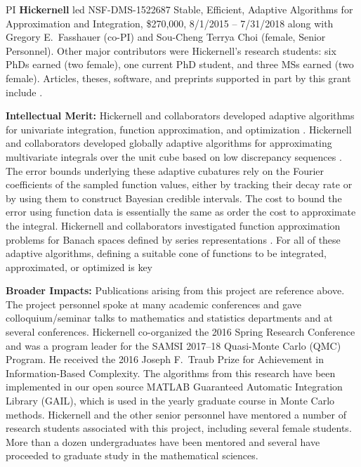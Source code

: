 \documentclass[11pt]{article}
\begin{document}

\noindent PI \textbf{Hickernell} led NSF-DMS-1522687 Stable, Efficient, Adaptive Algorithms for Approximation and Integration,
		\$270,000, 8/1/2015 -- 7/31/2018 along with Gregory E.\ Fasshauer (co-PI) and  Sou-Cheng Terrya Choi (female, Senior Personnel).  Other major contributors were Hickernell's research students: 
		six PhDs earned (two female), one current PhD student, and three MSs earned (two female).
Articles, theses,
software, and preprints supported in
part by this
grant
include
\cite{ala_augmented_2017,
	ChoEtal17a,
	ChoEtal20a,
	Din15a,
	DinHic20a,
	GilEtal16a,
	Hic17a,
	HicJag18b,
	HicJim16a,
	HicEtal18a,
	HicEtal17a,
	HicKriWoz19a,
	RatHic19a,
	GilJim16b,
	JimHic16a,
	JohFasHic18a,
	Li16a,
	Liu17a,
	MarEtal18a,
	mccourt_stable_2017,
	MCCEtal19a,
	mishra_hybrid_2018,
	MisEtal19a,
	rashidinia_stable_2016,
	rashidinia_stable_2018,
	Zha18a,
	Zha17a,
	Zho15a,
	ZhoHic15a}.

\noindent \textbf{Intellectual Merit:}
Hickernell and collaborators developed adaptive algorithms for univariate integration, function approximation, and optimization \cite{ChoEtal17a,HicEtal14b, Din15a, Ton14a, Zha18a}.
Hickernell and collaborators developed globally adaptive algorithms for approximating multivariate integrals over the unit cube based on low discrepancy sequences \cite{HicJim16a,HicEtal17a,JimHic16a,RatHic19a}.  The error bounds underlying these adaptive cubatures rely on the Fourier coefficients of the sampled function values, either by tracking their decay rate or by using them to construct Bayesian credible intervals. The cost to bound the error using function data is essentially the same as order the cost to approximate the integral. 
Hickernell and collaborators investigated function approximation problems for Banach spaces defined by series representations \cite{DinHic20a,DinEtal20a}.  For all of these adaptive algorithms, defining a suitable cone of functions to be integrated, approximated, or optimized is key

\noindent \textbf{Broader Impacts:}
Publications arising from this project are reference above.  
The project personnel spoke at many academic conferences and gave colloquium/seminar talks to mathematics and statistics departments and at several conferences.  Hickernell co-organized the 2016 Spring Research Conference and was a program leader for the SAMSI 2017--18 Quasi-Monte Carlo (QMC) Program.   He received the 2016 Joseph F.\ Traub Prize for Achievement in Information-Based Complexity. The algorithms from this research have been implemented in our open source MATLAB Guaranteed Automatic Integration Library (GAIL), which is used in the yearly graduate course in Monte Carlo methods.  Hickernell and the other senior personnel have mentored a number of research students associated with this project, including several female students.  More than a dozen undergraduates have been mentored and several have proceeded to graduate study in the mathematical sciences. 
\end{document}
